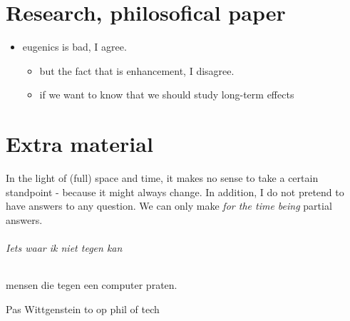 \documentclass[../main/main.tex]{subfiles}
\begin{document}
\newpage
\part{Research, philosofical paper}
\begin{itemize}
\item eugenics is bad, I agree.
\begin{itemize}
\item but the fact that is enhancement, I disagree.	
\item if we want to know that we should study long-term effects
\end{itemize}
\end{itemize}

\newpage
\part{Extra material}
In the light of (full) space and time, it makes no sense to take a certain standpoint - because it might always change. In addition, I do not pretend to have answers to any question. We can only make \textit{for the time being} partial answers. 

\paragraph{Iets waar ik niet tegen kan} mensen die tegen een computer praten.

Pas Wittgenstein to op phil of tech
\end{document}
